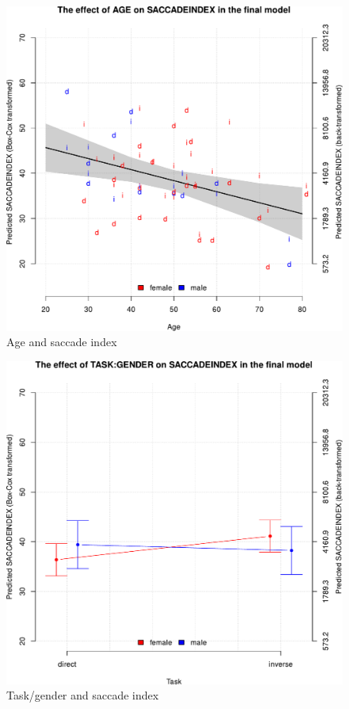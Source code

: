 \documentclass[output=paper]{langscibook}
\begin{document}
\begin{figure}
        \includegraphics[height=.45\textheight]{figures/Ferreira-Figure1.9.pdf}
        \caption{Age and saccade index\label{fig9h}}
\end{figure}

\begin{figure}
        \includegraphics[height=.45\textheight]{figures/Ferreira-Figure1.10.pdf}
        \caption{Task/gender and saccade index\label{fig10h}}
\end{figure}
\end{document}

